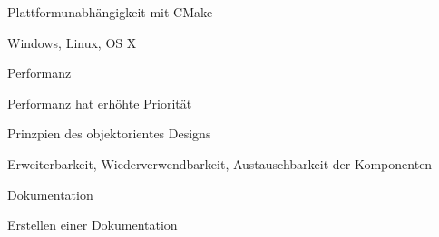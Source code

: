 \begin{compactenum}[a)]
	\item Plattformunabhängigkeit mit CMake
		\begin{compactenum}[1.]
			\item Windows, Linux, OS X
		\end{compactenum}
		\item Performanz
		\begin{compactenum}[1.]
			\item Performanz hat erhöhte Priorität
		\end{compactenum}
		\item Prinzpien des objektorientes Designs
		\begin{compactenum}[1.]
			\item Erweiterbarkeit, Wiederverwendbarkeit, Austauschbarkeit der Komponenten
		\end{compactenum}
		\item Dokumentation
		\begin{compactenum}[1.]
			\item Erstellen einer Dokumentation
		\end{compactenum}
\end{compactenum}


